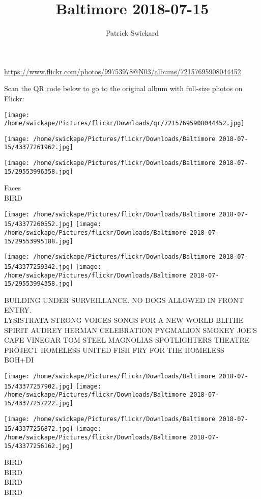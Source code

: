\documentclass[10pt,letterpaper]{article}
\title{Baltimore 2018-07-15}
\author{Patrick Swickard}
\date{}
\begin{document}
\maketitle

\url{https://www.flickr.com/photos/99753978@N03/albums/72157695908044452}

Scan the QR code below to go to the original album with full-size photos on Flickr:

\texttt{[image: /home/swickape/Pictures/flickr/Downloads/qr/72157695908044452.jpg]}
\pagebreak

\texttt{[image: /home/swickape/Pictures/flickr/Downloads/Baltimore 2018-07-15/43377261962.jpg]}

\vspace{0.25in}
\texttt{[image: /home/swickape/Pictures/flickr/Downloads/Baltimore 2018-07-15/29553996358.jpg]}

Faces\\
BIRD
\pagebreak

\texttt{[image: /home/swickape/Pictures/flickr/Downloads/Baltimore 2018-07-15/43377260552.jpg]}
\texttt{[image: /home/swickape/Pictures/flickr/Downloads/Baltimore 2018-07-15/29553995188.jpg]}

\texttt{[image: /home/swickape/Pictures/flickr/Downloads/Baltimore 2018-07-15/43377259342.jpg]}
\texttt{[image: /home/swickape/Pictures/flickr/Downloads/Baltimore 2018-07-15/29553994358.jpg]}

BUILDING UNDER SURVEILLANCE.  NO DOGS ALLOWED IN FRONT ENTRY.\\
LYSISTRATA STRONG VOICES SONGS FOR A NEW WORLD BLITHE SPIRIT AUDREY HERMAN CELEBRATION PYGMALION SMOKEY JOE'S CAFE VINEGAR TOM STEEL MAGNOLIAS SPOTLIGHTERS THEATRE\\
PROJECT HOMELESS UNITED FISH FRY FOR THE HOMELESS\\
BOH+DI
\pagebreak

\texttt{[image: /home/swickape/Pictures/flickr/Downloads/Baltimore 2018-07-15/43377257902.jpg]}
\texttt{[image: /home/swickape/Pictures/flickr/Downloads/Baltimore 2018-07-15/43377257222.jpg]}

\texttt{[image: /home/swickape/Pictures/flickr/Downloads/Baltimore 2018-07-15/43377256872.jpg]}
\texttt{[image: /home/swickape/Pictures/flickr/Downloads/Baltimore 2018-07-15/43377256162.jpg]}

BIRD\\
BIRD\\
BIRD\\
BIRD
\pagebreak
\end{document}
